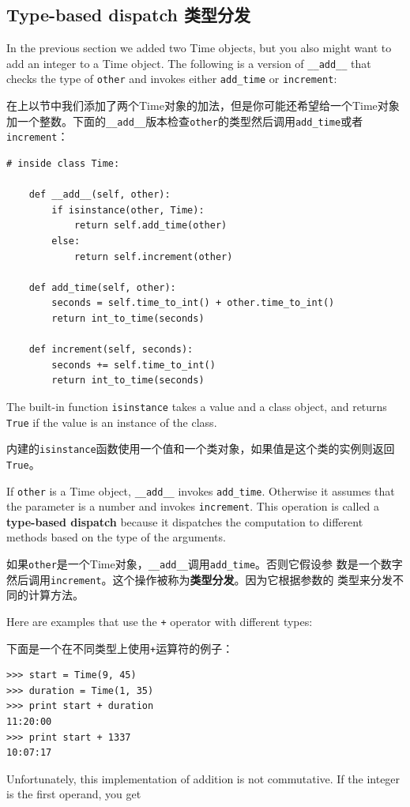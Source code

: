 \documentclass[10pt]{book}
\begin{document}
\begin{CJK}{UTF8}{gbsn}
\section{Type-based dispatch 类型分发}

In the previous section we added two Time objects, but you
also might want to add an integer to a Time object.  The
following is a version of \verb"__add__"
that checks the type of {\tt other} and invokes either
\verb"add_time" or {\tt increment}:

在上以节中我们添加了两个Time对象的加法，但是你可能还希望给一个Time对象加一个整数。下面的\verb"__add__"版本检查{\tt other}的类型然后调用\verb"add_time"或者{\tt increment}：

\begin{verbatim}
# inside class Time:

    def __add__(self, other):
        if isinstance(other, Time):
            return self.add_time(other)
        else:
            return self.increment(other)

    def add_time(self, other):
        seconds = self.time_to_int() + other.time_to_int()
        return int_to_time(seconds)

    def increment(self, seconds):
        seconds += self.time_to_int()
        return int_to_time(seconds)
\end{verbatim}
%
The built-in function {\tt isinstance} takes a value and a
class object, and returns {\tt True} if the value is an instance
of the class.

内建的{\tt isinstance}函数使用一个值和一个类对象，如果值是这个类的实例则返回
{\tt True}。

If {\tt other} is a Time object, \verb"__add__" invokes
\verb"add_time".  Otherwise it assumes that the parameter
is a number and invokes {\tt increment}.  This operation is
called a {\bf type-based dispatch} because it dispatches the
computation to different methods based on the type of the
arguments.

如果{\tt other}是一个Time对象，\verb"__add__"调用\verb"add_time"。否则它假设参
数是一个数字然后调用{\tt increment}。这个操作被称为{\bf 类型分发}。因为它根据参数的
类型来分发不同的计算方法。

Here are examples that use the {\tt +} operator with different
types:

下面是一个在不同类型上使用{\tt +}运算符的例子：

\begin{verbatim}
>>> start = Time(9, 45)
>>> duration = Time(1, 35)
>>> print start + duration
11:20:00
>>> print start + 1337
10:07:17
\end{verbatim}
%
Unfortunately, this implementation of addition is not commutative.
If the integer is the first operand, you get


\end{CJK}
\end{document}
